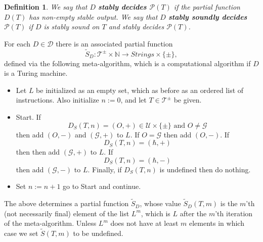 \documentclass{amsart}  %
\numberwithin{equation}{section}
\newtheorem{definition}[equation]{Definition}
\theoremstyle{definition}
\theoremstyle{remark}
\begin{document}
{\begin{definition}
We say that $D$ \textbf{\emph{stably decides $\mathcal{P} (T)$}}  if the partial function $D(T) $ has non-empty stable output. We say that $D$ \textbf{\emph{stably soundly decides $\mathcal{P} (T)$}}  if $D$ is stably sound on $T$ and stably decides $\mathcal{P} (T)$. 
\end{definition}
For each $D \in \mathcal{D}$ there is an associated  partial function $$\widetilde{S} _{D}: \mathcal{T} ^{\pm}  \times \mathbb{N} \to Strings \times \{\pm\},  $$ defined via the following meta-algorithm,  which is a computational algorithm if $D$ is a Turing machine.
\begin{itemize}
   \item Let $L$ be initialized as an empty set, which as before as an ordered list of instructions. Also initialize $n:=0$, and let $T \in \mathcal{T} ^{\pm} $ be given.
\item Start. If $$D _{S} (T,n) = (O,+) \in \mathcal{U} \times \{\pm\} \text{ and $O \neq \mathcal{G}$}$$  then add $ (O,-) $ and $(\mathcal{G},+) $ to $L$.  If $O = \mathcal{G}$ then add $(O,-)$. 
If $$D _{S} (T,n) = (\hbar,+) $$ then
then  add $(\mathcal{G},+)$ to $L$.
If $$D _{S} (T,n) = (\hbar,-) $$ then
add $(\mathcal{G},-)$ to $L$. Finally, if $D _{S} (T,n)  $ is undefined then do nothing.
\item Set $n:=n+1$ go to Start and continue.
\end{itemize}





The above determines a partial function $\widetilde{S} _{D} $, whose value $\widetilde{S} _{D}  (T,m) $ is the $m$'th (not necessarily final) element of the list $L ^{m} $, which is $L$ after the $m$'th iteration of the meta-algorithm.  Unless $L ^{m} $ does not have at least $m$ elements in which case we set $\widetilde{S} (T,m) $ to be undefined.

}
\end{document}

